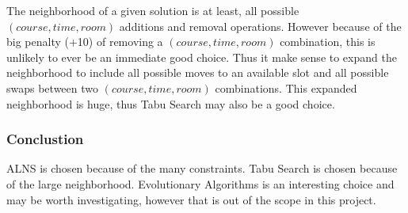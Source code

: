 The neighborhood of a given solution is at least, all possible $(course, time, room)$ additions and removal operations. However because of the big penalty (+10) of removing a $(course, time, room)$ combination, this is unlikely to ever be an immediate good choice. Thus it make sense to expand the neighborhood to include all possible moves to an available slot and all possible swaps between two $(course, time, room)$ combinations. This expanded neighborhood is huge, thus Tabu Search may also be a good choice.

\subsubsection{Conclustion}

ALNS is chosen because of the many constraints. Tabu Search is chosen because of the large neighborhood. Evolutionary Algorithms is an interesting choice and may be worth investigating, however that is out of the scope in this project.
